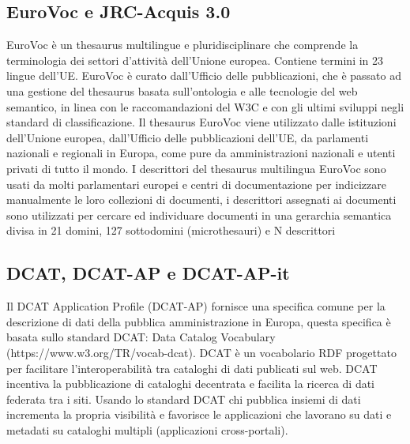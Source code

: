 \documentclass{article}
\theoremstyle{plain}
\theoremstyle{definition}
\begin{document}
\subsection{EuroVoc e JRC-Acquis 3.0}
EuroVoc è un thesaurus multilingue e pluridisciplinare che comprende la terminologia dei settori d'attività dell'Unione europea. Contiene termini in 23 lingue dell'UE. EuroVoc è curato dall'Ufficio delle pubblicazioni, che è passato ad una gestione del thesaurus basata sull'ontologia e alle tecnologie del web semantico, in linea con le raccomandazioni del W3C e con gli ultimi sviluppi negli standard di classificazione. Il thesaurus EuroVoc viene utilizzato dalle istituzioni dell'Unione europea, dall'Ufficio delle pubblicazioni dell'UE, da parlamenti nazionali e regionali in Europa, come pure da amministrazioni nazionali e utenti privati di tutto il mondo.
\footnotemark
{}
I descrittori del thesaurus multilingua EuroVoc sono usati da molti parlamentari europei e centri di documentazione per indicizzare manualmente le loro collezioni di documenti, i descrittori assegnati ai documenti sono utilizzati per cercare ed individuare documenti in una gerarchia semantica divisa in 21 domini, 127 sottodomini (microthesauri) e N descrittori



\subsection{DCAT, DCAT-AP e DCAT-AP-it}
Il DCAT Application Profile (DCAT-AP) fornisce una specifica comune per la descrizione di dati della pubblica amministrazione in Europa, questa specifica è basata sullo standard DCAT: Data Catalog Vocabulary (https://www.w3.org/TR/vocab-dcat). DCAT è un vocabolario RDF progettato per facilitare l'interoperabilità tra cataloghi di dati publicati sul web. DCAT incentiva la pubblicazione di cataloghi decentrata e facilita la ricerca di dati federata tra i siti. Usando lo standard DCAT chi pubblica insiemi di dati incrementa la propria visibilità e favorisce le applicazioni che lavorano su dati e metadati su cataloghi multipli (applicazioni cross-portali).
\end{document}
